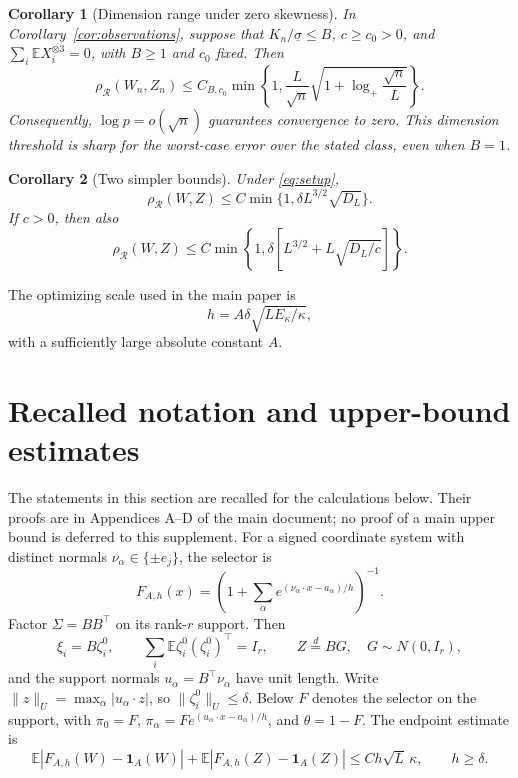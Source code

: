 \documentclass[11pt,a4paper]{article}
\newtheorem{corollary}{Corollary}
\theoremstyle{remark}
\newcommand{\E}{\mathbb E}
\newcommand{\rh}{\rho_{\mathcal R}}
\newcommand{\ind}{\mathbf 1}
\begin{document}
\begin{corollary}[Dimension range under zero skewness]\label{cor:zero-threshold}
In Corollary~\ref{cor:observations}, suppose that
\(K_n/\underline\sigma\le B\), \(c\ge c_0>0\), and
\(\sum_i\E X_i^{\otimes3}=0\), with \(B\ge1\) and \(c_0\) fixed.
Then
\begin{equation}
 \rh(W_n,Z_n)\le C_{B,c_0}\min\!\left\{1,
 \frac L{\sqrt n}\sqrt{1+\log_+\frac{\sqrt n}{L}}\right\}.
 \label{eq:zero-fixed}
\end{equation}
Consequently, \(\log p=o(\sqrt n)\) guarantees convergence to zero.
This dimension threshold is sharp for the worst-case error over the
stated class, even when \(B=1\).
\end{corollary}

\begin{corollary}[Two simpler bounds]\label{cor:forms}
Under \eqref{eq:setup},
\begin{equation}
 \rh(W,Z)\le C\min\{1,\delta L^{3/2}\sqrt{D_L}\}.
 \label{eq:unrestricted}
\end{equation}
If \(c>0\), then also
\begin{equation}
 \rh(W,Z)\le C\min\!\left\{1,
 \delta\left[L^{3/2}+L\sqrt{D_L/c}\right]\right\}.
 \label{eq:gap-refined}
\end{equation}
\end{corollary}


The optimizing scale used in the main paper is
\begin{equation}
h=A\delta\sqrt{LE_\kappa/\kappa},
\label{eq:optimal-scale}
\end{equation}
with a sufficiently large absolute constant \(A\).



\section{Recalled notation and upper-bound estimates}
\label{sup:recalled}\label{sec:smoothing}\label{sec:support}
The statements in this section are recalled for the calculations below.
Their proofs are in Appendices A--D of the main document; no proof of a
main upper bound is deferred to this supplement.
For a signed coordinate system with distinct normals
\(\nu_\alpha\in\{\pm e_j\}\), the selector is
\[
F_{A,h}(x)=\left(1+\sum_\alpha
e^{(\nu_\alpha\cdot x-a_\alpha)/h}\right)^{-1}.
\]
Factor \(\Sigma=BB^\top\) on its rank-\(r\) support. Then
\begin{equation}
 \xi_i=B\zeta_i^0,\qquad
 \sum_i\E\zeta_i^0(\zeta_i^0)^\top=I_r,\qquad Z\stackrel d=BG,
 \quad G\sim N(0,I_r),
 \label{eq:support}
\end{equation}
and the support normals \(u_\alpha=B^\top\nu_\alpha\) have unit length.
Write \(\|z\|_U=\max_\alpha|u_\alpha\cdot z|\), so
\(\|\zeta_i^0\|_U\le\delta\). Below \(F\) denotes the selector on
the support, with
\(\pi_0=F\),
\(\pi_\alpha=Fe^{(u_\alpha\cdot x-a_\alpha)/h}\), and
\(\theta=1-F\).
The endpoint estimate is
\begin{equation}
 \E|F_{A,h}(W)-\ind_A(W)|+
 \E|F_{A,h}(Z)-\ind_A(Z)|\le Ch\sqrt L\,\kappa,
 \qquad h\ge\delta.
 \label{eq:endpoint-min}
\end{equation}
\end{document}
